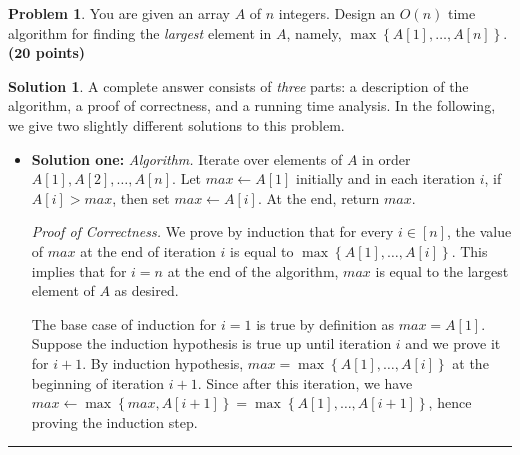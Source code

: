 \documentclass{article}
\theoremstyle{definition}
\newtheorem{problem}{Problem}
\def\fline{\rule{0.75\linewidth}{0.5pt}}
\newcommand{\finishline}{\vspace{-15pt}\begin{center}\fline\end{center}}
\newtheorem*{solution*}{Solution}
\newenvironment{solution}{\begin{solution*}}{{\finishline} \end{solution*}}
\newcommand{\grade}[1]{\hfill{\textbf{($\mathbf{#1}$ points)}}}
\newcommand{\set}[1]{\ensuremath{\left\{ #1 \right\}}}
\begin{document}
\begin{problem}
	You are given an array $A$ of $n$ integers. Design an $O(n)$ time algorithm for finding the \emph{largest} element in $A$, namely, $\max\set{A[1],\ldots,A[n]}$. \grade{20} 
\end{problem}
\begin{solution}
	A complete answer consists of \emph{three} parts: a description of the algorithm, a proof of correctness, and a running time analysis. In the following, we give two slightly different solutions to this problem.
	 \begin{itemize}
	 	\item \textbf{Solution one:} \emph{Algorithm.} Iterate over elements of $A$ in order $A[1],A[2],\ldots,A[n]$. Let $max \leftarrow A[1]$ initially and in each iteration $i$, if $A[i] > max$, then set $max \leftarrow A[i]$. At the end, return $max$. 

		\smallskip
		\emph{Proof of Correctness.} We prove by induction that for every $i \in [n]$, the value of $max$ at the end of iteration $i$ is equal to $\max\set{A[1],\ldots,A[i]}$. This implies that for $i=n$ at the end of the algorithm, 
		$max$ is equal to the largest element of $A$ as desired. 
		
		The base case of induction for $i=1$ is true by definition as $max=A[1]$. Suppose the induction hypothesis is true up until iteration $i$ and we prove it for $i+1$. By induction hypothesis, $max = \max\set{A[1],\ldots,A[i]}$
		at the beginning of iteration $i+1$. Since after this iteration, we have $max \leftarrow \max\set{max,A[i+1]} = \max\set{A[1],\ldots,A[i+1]}$, hence proving the induction step. 
		

\end{itemize}
\end{solution}
\end{document}
